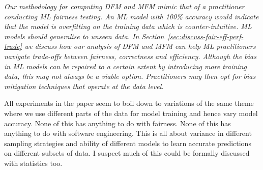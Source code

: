 \documentclass[conference]{IEEEtran}
\newcommand{\highlight}[1]{\begin{framed}%
  \noindent\emph{#1}
\end{framed}}
\begin{document}
\highlight{Our methodology for computing DFM and MFM mimic that of
a practitioner conducting ML fairness testing. An ML model with 100\%
accuracy would indicate that the model is overfitting on the training
data which is counter-intuitive. ML models should generalise to unseen
data. In Section~\ref{sec:discuss-fair-eff-perf-trade} we discuss how
our analysis of DFM and MFM can help ML practitioners navigate
trade-offs between fairness, correctness and efficiency. Although the
bias in ML models can be repaired to a certain extent by introducing
more training data, this may not always be a viable
option. Practitioners may then opt for bias mitigation techniques that
operate at the data level.}

 All experiments in the paper seem to boil down to variations of the
 same theme where we use different parts of the data for model
 training and hence vary model accuracy. None of this has anything to
 do with fairness. None of this has anything to do with software
 engineering. This is all about variance in different sampling
 strategies and ability of different models to learn accurate
 predictions on different subsets of data. I suspect much of this
 could be formally discussed with statistics too.
\end{document}
